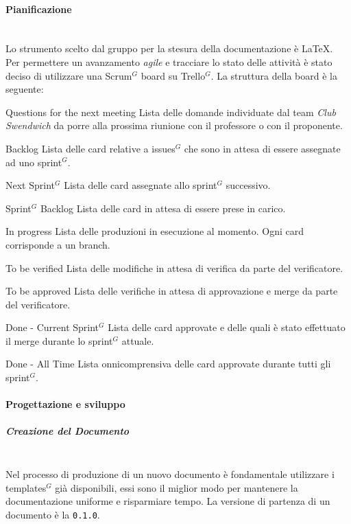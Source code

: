 \paragraph{Pianificazione}
\mbox{}\\
Lo strumento scelto dal gruppo per la stesura della documentazione è \LaTeX.\\
Per permettere un avanzamento \textit{agile} e tracciare lo stato delle attività è stato deciso di utilizzare una Scrum$^G$  board su Trello$^G$.
La struttura della board è la seguente:
\begin{itemdescript}
    \item [Questions for the next meeting] Lista delle domande individuate dal team \textit{Club Swendwich} da porre alla prossima riunione con il professore o con il proponente.
    \item [Backlog] Lista delle card relative a issues$^G$  che sono in attesa di essere assegnate ad uno sprint$^G$.
    \item [Next Sprint$^G$] Lista delle card assegnate allo sprint$^G$ successivo.
    \item [Sprint$^G$ Backlog] Lista delle card in attesa di essere prese in carico.
    \item [In progress] Lista delle produzioni in esecuzione al momento. Ogni card corrisponde a un branch.
    \item [To be verified] Lista delle modifiche in attesa di verifica da parte del verificatore.
    \item [To be approved] Lista delle verifiche in attesa di approvazione e merge da parte del verificatore.
    \item [Done - Current Sprint$^G$] Lista delle card approvate e delle quali è stato effettuato il merge durante lo sprint$^G$ attuale.
    \item [Done - All Time] Lista onnicomprensiva delle card approvate durante tutti gli sprint$^G$.
\end{itemdescript}


\paragraph{Progettazione e sviluppo}
\subparagraph{Creazione del Documento}
\mbox{}\\
Nel processo di produzione di un nuovo documento è fondamentale utilizzare i templates$^G$ già
disponibili, essi sono il miglior modo per mantenere la documentazione uniforme e
risparmiare tempo.
La versione di partenza di un documento è la \texttt{0.1.0}.

